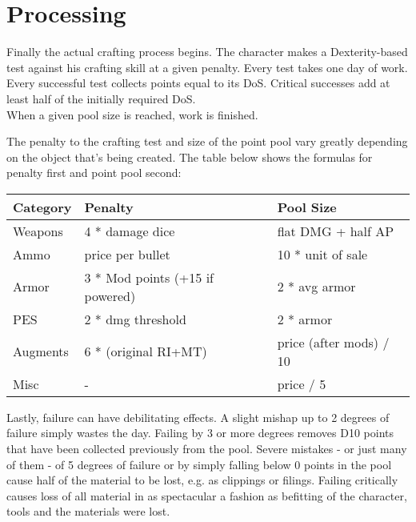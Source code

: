 \documentclass[12pt,a4paper,openany,usenames,dvipsnames]{book}
\begin{document}
	\chapter{Processing}
	\vspace{-10mm}%
	Finally the actual crafting process begins.
	The character makes a Dexterity-based test against his crafting skill at a given penalty.
	Every test takes one day of work.
	Every successful test collects points equal to its DoS.
	Critical successes add at least half of the initially required DoS.
	\\%
	When a given pool size is reached, work is finished.\par
	The penalty to the crafting test and size of the point pool vary greatly depending on the object that’s being created. The table below shows the formulas for penalty first and point pool second:
	\par
	\begin{tabularx}{\columnwidth}{X|ll}
		Category & Penalty & Pool Size \\ \hline
		Weapons & 4 * damage dice & flat DMG + half AP \\
		Ammo & price per bullet & 10 * unit of sale \\
		Armor & 3 * Mod points (+15 if powered) & 2 * avg armor \\
		PES & 2 * dmg threshold & 2 * armor \\
		Augments & 6 * (original RI+MT) & price (after mods) / 10 \\
		Misc & - & price / 5
	\end{tabularx}\par
	Lastly, failure can have debilitating effects.
	A slight mishap up to 2 degrees of failure simply wastes the day.
	Failing by 3 or more degrees removes D10 points that have been collected previously from the pool.
	Severe mistakes - or just many of them - of 5 degrees of failure or by simply falling below 0 points in the pool cause half of the material to be lost, e.g. as clippings or filings.
	Failing critically causes loss of all material in as spectacular a fashion as befitting of the character, tools and the materials were lost.
\end{document}
